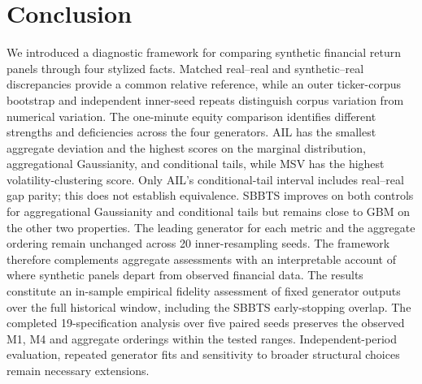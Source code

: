 \section{Conclusion}\label{sec:conclusion}

{\color{red}
We introduced a diagnostic framework for comparing synthetic financial
return panels through four stylized facts.
Matched real--real and synthetic--real discrepancies provide a common
relative reference, while an outer ticker-corpus bootstrap and
independent inner-seed repeats distinguish corpus variation from
numerical variation.
The one-minute equity comparison identifies different strengths and
deficiencies across the four generators.
AIL has the smallest aggregate deviation and the highest scores on
the marginal distribution, aggregational Gaussianity, and conditional
tails, while MSV has the highest volatility-clustering score.
Only AIL's conditional-tail interval includes real--real gap parity;
this does not establish equivalence.
SBBTS improves on both controls for aggregational Gaussianity and
conditional tails but remains close to GBM on the other two properties.
The leading generator for each metric and the aggregate ordering
remain unchanged across 20 inner-resampling seeds.
The framework therefore complements aggregate assessments with an
interpretable account of where synthetic panels depart from observed
financial data.
The results constitute an in-sample empirical fidelity assessment of
fixed generator outputs over the full historical window, including the
SBBTS early-stopping overlap. The completed 19-specification analysis over
five paired seeds preserves the observed M1, M4 and aggregate orderings
within the tested ranges. Independent-period evaluation, repeated generator
fits and sensitivity to broader structural choices remain necessary extensions.
}
